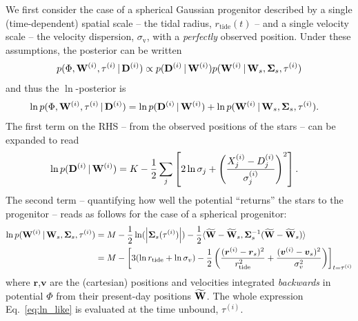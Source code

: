 \documentclass[letterpaper,12pt,preprint]{aastex}
\newcommand{\given}{\,|\,}
\newcommand{\D}{{\bf D}}
\newcommand{\W}{{\bf W}}
\newcommand{\bSigma}{{\bf \Sigma}}
\newcommand{\bsigma}{\boldsymbol\sigma}
\begin{document}

We first consider the case of a spherical Gaussian progenitor described by a single (time-dependent) spatial scale -- the tidal radius, $r_{\mathrm{tide}}(t)$ -- and a single velocity scale -- the velocity dispersion, $\sigma_\mathrm{v}$, with a \emph{perfectly} observed position. Under these assumptions, the posterior can be written
\begin{align}
	p(\Phi, \W^{(i)}, \tau^{(i)} \given \D^{(i)}) &\propto 
		p(\D^{(i)} \given \W^{(i)}) p(\W^{(i)} \given \W_s, \bSigma_s, \tau^{(i)})\\
\end{align}
and thus the $\ln$-posterior is
\begin{align}
	\ln p(\Phi, \W^{(i)}, \tau^{(i)} \given \D^{(i)}) &= \ln p(\D^{(i)} \given \W^{(i)}) + \ln p(\W^{(i)} \given \W_s, \bSigma_s, \tau^{(i)}).
\end{align}
The first term on the RHS -- from the observed positions of the stars	-- can be expanded to read
\begin{align}
	\ln p(\D^{(i)} \given \W^{(i)}) &= K - \frac{1}{2}\sum_j \left[ 2\ln\sigma_j + \left(\frac{X^{(i)}_j-D^{(i)}_j}{\sigma^{(i)}_j}\right)^2\right].
\end{align}
The second term -- quantifying how well the potential ``returns'' the stars to the progenitor -- reads as follows for the case of a spherical progenitor:
\begin{align}
	\ln p(\W^{(i)} \given \W_s, \bSigma_s, \tau^{(i)}) &= M - \frac{1}{2}\ln(\left\vert\bSigma_s(\tau^{(i)})\right\vert) - \frac{1}{2}\langle \widetilde{\W}-\widetilde{\W}_s, \bSigma_s^{-1}(\widetilde{\W}-\widetilde{\W}_s) \rangle\\
	&= M - \left[3(\ln r_{\rm tide} + \ln \sigma_v) - \frac{1}{2}\left( \frac{({\boldsymbol r}^{(i)}-{\boldsymbol r}_s)^2}{r_{\rm tide}^2} + \frac{ ({\boldsymbol v}^{(i)}-{\boldsymbol v}_s)^2}{\sigma_v^2} \right)\right]_{t=\tau^{(i)}}\label{eq:ln_like}
\end{align}
where $\boldsymbol r$,$\boldsymbol v$ are the (cartesian) positions and velocities integrated \emph{backwards} in potential $\Phi$ from their present-day positions $\widetilde{\W}$. The whole expression Eq.~\ref{eq:ln_like} is evaluated at the time unbound, $\tau^{(i)}$.
\end{document}
